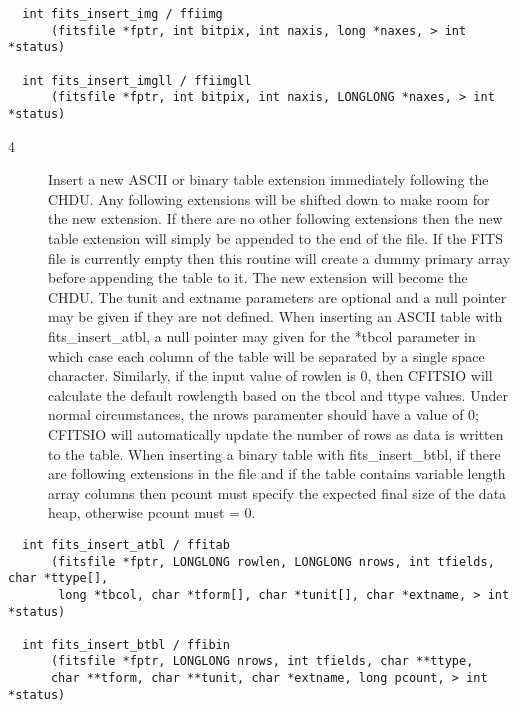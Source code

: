 \documentclass[11pt]{book}
\begin{document}
\begin{verbatim}
  int fits_insert_img / ffiimg
      (fitsfile *fptr, int bitpix, int naxis, long *naxes, > int *status)

  int fits_insert_imgll / ffiimgll
      (fitsfile *fptr, int bitpix, int naxis, LONGLONG *naxes, > int *status)
\end{verbatim}

\begin{description}
\item[4 ] Insert a new ASCII or binary table extension immediately following the CHDU.
    Any following extensions will be shifted down to make room for the
    new extension.  If there are no other following extensions then the
    new table extension will simply be appended to the end of the
    file.   If the FITS file is currently empty then this routine will
    create a dummy primary array before appending the table to it. The
    new extension will become the CHDU.  The tunit and extname
    parameters are optional and a null pointer may be given if they are
    not defined.  When inserting an ASCII table with
    fits\_insert\_atbl, a null pointer  may given for the *tbcol
    parameter in which case each column of the table will be separated
    by a single space character. Similarly, if the input value of
    rowlen is  0, then CFITSIO will calculate the default rowlength
    based on the tbcol and ttype values.  Under normal circumstances,
    the nrows
    paramenter should have a value of 0; CFITSIO will automatically update
    the number of rows as data is written to the table.  When inserting a binary table
    with fits\_insert\_btbl, if there are following extensions in the
    file and if the table contains variable length array columns then
    pcount must specify the expected final size of the data heap,
   otherwise pcount must = 0. \label{ffitab} \label{ffibin}
\end{description}

\begin{verbatim}
  int fits_insert_atbl / ffitab
      (fitsfile *fptr, LONGLONG rowlen, LONGLONG nrows, int tfields, char *ttype[],
       long *tbcol, char *tform[], char *tunit[], char *extname, > int *status)

  int fits_insert_btbl / ffibin
      (fitsfile *fptr, LONGLONG nrows, int tfields, char **ttype,
      char **tform, char **tunit, char *extname, long pcount, > int *status)
\end{verbatim}
\end{document}
